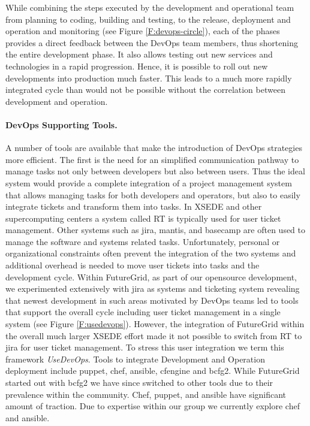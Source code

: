 \documentclass[graybox]{svmult}
\begin{document}
While combining the steps executed by the development and operational team from planning to coding, building and testing, to the release, deployment and operation and monitoring (see Figure \ref{F:devops-circle}), each of the phases provides a direct feedback between the DevOps team members, thus shortening the entire development phase. It also allows testing out new services and technologies in a rapid progression. Hence, it is possible to roll out new developments into production much faster. This leads to a much more rapidly integrated cycle than would not be possible without the correlation between development and operation.

\paragraph{DevOps Supporting Tools.}

A number of tools are available that make the introduction of DevOps strategies more efficient. The first is the need for an simplified communication pathway to manage tasks not only between developers but also between users. Thus the ideal system would provide a complete integration of a project management system that allows managing tasks for both developers and operators, but also to easily integrate tickets and transform them into tasks. In XSEDE and other supercomputing centers a system called RT \cite{www-rt} is typically used for user ticket management. Other systems such as jira, mantis, and basecamp are often used to manage the software and systems related tasks. Unfortunately, personal or organizational constraints often prevent the integration of the two systems and additional overhead is needed to move user tickets into tasks and the development cycle. Within FutureGrid, as part of our opensource development, we experimented extensively with jira as systems and ticketing system \cite{www-jira-ticket} revealing that newest development in such areas motivated by DevOps teams led to tools that support the overall cycle including user ticket management in a single system (see Figure \ref{F:usedevops}). However, the integration of FutureGrid within the overall much larger XSEDE effort made it not possible to switch from RT to jira for user ticket management. To stress this user integration we term this framework {\em UseDevOps}. Tools to integrate Development and Operation deployment include puppet, chef, ansible, cfengine and bcfg2. While FutureGrid started out with bcfg2 we have since switched to other tools due to their prevalence within the community. Chef, puppet, and ansible have significant amount of traction. Due to expertise within our group we currently explore chef and ansible.
\end{document}

